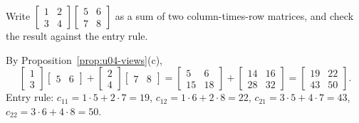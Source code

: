 \begin{exercise}\label{ex:u04-rank1}
Write $\begin{bmatrix} 1&2\\ 3&4\end{bmatrix}\begin{bmatrix} 5&6\\ 7&8\end{bmatrix}$ as a sum of
two column-times-row matrices, and check the result against the entry rule.
\end{exercise}
\begin{solution}
By Proposition~\ref{prop:u04-views}(c),
\[
  \begin{bmatrix} 1\\ 3\end{bmatrix}\begin{bmatrix} 5&6\end{bmatrix}
  +\begin{bmatrix} 2\\ 4\end{bmatrix}\begin{bmatrix} 7&8\end{bmatrix}
  =\begin{bmatrix} 5&6\\ 15&18\end{bmatrix}+\begin{bmatrix} 14&16\\ 28&32\end{bmatrix}
  =\begin{bmatrix} 19&22\\ 43&50\end{bmatrix}.
\]
Entry rule: $c_{11}=1\cdot5+2\cdot7=19$, $c_{12}=1\cdot6+2\cdot8=22$,
$c_{21}=3\cdot5+4\cdot7=43$, $c_{22}=3\cdot6+4\cdot8=50$.
\end{solution}
